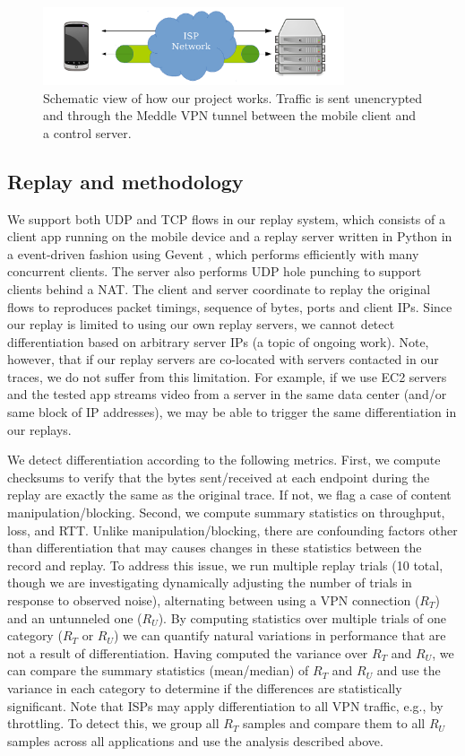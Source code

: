 \documentclass[letterpaper]{sig-alternate-2013}
\begin{document}
\begin{figure}[t]
\centering
\includegraphics[width=3.5in]{figures/meddle}
\vspace{-0.5cm}
\caption{Schematic view of how our project works. Traffic is sent unencrypted and through the Meddle VPN tunnel between the mobile client and a control server.}
\label{fig:meddle}
\end{figure}

\subsection{Replay and methodology}
We support both UDP and TCP flows in our replay system, which consists of a client app running on the mobile device and a replay server written in Python in a event-driven fashion using Gevent \cite{gevent}, which performs efficiently with many concurrent clients. The server also performs UDP hole punching to support clients behind a NAT. The client and server coordinate to replay the original flows to reproduces packet timings, sequence of bytes, ports and client IPs. Since our replay is limited to using our own replay servers, we cannot detect differentiation based on arbitrary server IPs (a topic of ongoing work). Note, however, that if our replay servers are co-located with servers contacted in our traces, we do not suffer from this limitation. For example, if we use EC2 servers and the tested app streams video from a server in the same data center (and/or same block of IP addresses), we may be able to trigger the same differentiation in our replays.

We detect differentiation according to the following metrics. First, we compute checksums to verify that the bytes sent/received at each endpoint during the replay are exactly the same as the original trace. If not, we flag a case of content manipulation/blocking. Second, we compute summary statistics on throughput, loss, and RTT. Unlike manipulation/blocking, there are confounding factors other than differentiation that may causes changes in these statistics between the record and replay.
To address this issue, we run multiple replay trials (10 total, though we are investigating dynamically adjusting the number of trials in response to observed noise), alternating between using a VPN connection ($R_T$) and an untunneled one ($R_U$). By computing statistics over multiple trials of one category ($R_T$ or $R_U$) we can quantify natural variations in performance that are not a result of differentiation. Having computed the variance over $R_T$ and $R_U$, we can compare the summary statistics (mean/median) of $R_T$ and $R_U$ and use the variance in each category to determine if the differences are statistically significant.
Note that ISPs may apply differentiation to all VPN traffic, e.g., by throttling. To detect this, we group all $R_T$ samples and compare them to all $R_U$ samples across all applications and use the analysis described above.
\end{document}
